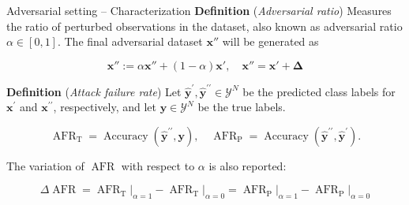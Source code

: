 \begin{frame}{Adversarial setting -- Characterization}
	\textbf{Definition} (\textit{Adversarial ratio}) Measures the ratio of perturbed observations in the dataset, 
    also known as adversarial ratio $\alpha \in [0,1]$. The final adversarial dataset $\bm{x}''$ will be generated as

    $$
    \bm{x}'' := \alpha \bm{x}'' + (1 - \alpha) \bm{x}', \quad \bm{x}'' = \bm{x}' + \bm{\Delta}
    $$

	\textbf{Definition} (\textit{Attack failure rate}) 
	Let $\hat{\bm{y}}^\prime, \hat{\bm{y}}^{\prime\prime} \in \mathcal{Y}^N$ be the predicted class 
    labels for $\bm{x}^\prime$ and $\bm{x}^{\prime \prime}$, respectively, 
    and let $\bm{y}\in \mathcal{Y}^N$ be the true labels.

	$$
        \operatorname{AFR}_\text{T} = \operatorname{Accuracy}(\hat{\bm{y}}^{\prime \prime}, \bm{y}), \quad
        \operatorname{AFR}_\text{P} = \operatorname{Accuracy}(\hat{\bm{y}}^{\prime \prime}, \hat{\bm{y}}^{\prime}).
    $$

	\vspace{0.2cm}

	The variation of $\operatorname{AFR}$ with respect to $\alpha$ is also reported:

	$$
		\Delta \operatorname{AFR} = \operatorname{AFR}_\text{T}\biggr|_{\alpha = 1} - \operatorname{AFR}_\text{T}\biggr|_{\alpha = 0} = \operatorname{AFR}_\text{P}\biggr|_{\alpha = 1} - \operatorname{AFR}_\text{P}\biggr|_{\alpha = 0}
	$$

\end{frame}

